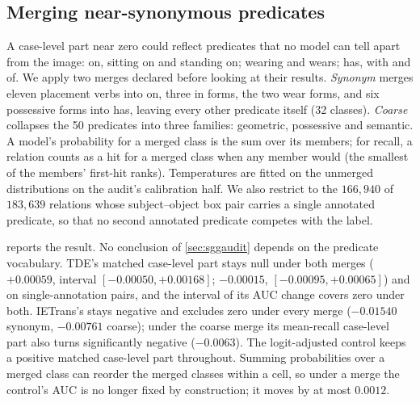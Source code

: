 \begin{table}[t]
\centering
\footnotesize
\setlength\tabcolsep{2.5pt}
\caption{\textbf{The matched split over 20 calibration halves}: case-level part, its mean, SD
and range over halves, and the number of halves whose image-clustered interval excludes zero.
``One $T$'': a single temperature for TDE and the baseline.}
\label{tab:splits}

\end{table}

\subsection{Merging near-synonymous predicates}\label{app:merge}

A case-level part near zero could reflect predicates that no model can tell apart from the
image: \textsf{on}, \textsf{sitting on} and \textsf{standing on}; \textsf{wearing} and
\textsf{wears}; \textsf{has}, \textsf{with} and \textsf{of}. We apply two merges declared
before looking at their results. \emph{Synonym} merges eleven placement verbs into
\textsf{on}, three \textsf{in} forms, the two \textsf{wear} forms, and six possessive forms
into \textsf{has}, leaving every other predicate itself (32 classes). \emph{Coarse} collapses
the 50 predicates into three families: geometric, possessive and semantic. A model's
probability for a merged class is the sum over its members; for recall, a relation counts as a
hit for a merged class when any member would (the smallest of the members' first-hit ranks).
Temperatures are fitted on the unmerged distributions on the audit's calibration half. We also
restrict to the $166{,}940$ of $183{,}639$ relations whose subject--object box pair carries a
single annotated predicate, so that no second annotated predicate competes with the label.

 reports the result. No conclusion of \cref{sec:sggaudit} depends on the
predicate vocabulary. TDE's matched case-level part stays null under both merges ($+0.00059$,
interval $[-0.00050,+0.00168]$; $-0.00015$, $[-0.00095,+0.00065]$) and on single-annotation
pairs, and the interval of its AUC change covers zero under both. IETrans's stays negative and
excludes zero under every merge ($-0.01540$ synonym, $-0.00761$ coarse); under the coarse merge
its mean-recall case-level part also turns significantly negative ($-0.0063$). The
logit-adjusted control keeps a positive matched case-level part throughout. Summing
probabilities over a merged class can reorder the merged classes within a cell, so under a
merge the control's AUC is no longer fixed by construction; it moves by at most $0.0012$.

